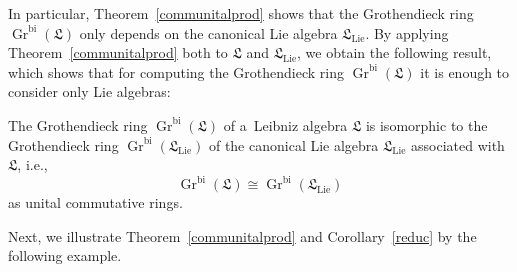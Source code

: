 \documentclass{jonasart}
\DeclareMathOperator{\bi}{bi}
\DeclareMathOperator{\K}{Gr}
\DeclareMathOperator{\lie}{Lie}
\newcommand{\lf}{\mathfrak{L}}
\begin{document}
	In particular, Theorem~\ref{communitalprod} shows that the Grothendieck ring
	$\K^{\bi}(\lf)$ only depends on the canonical Lie algebra $\lf_{\lie}$. By applying
	Theorem~\ref{communitalprod} both to $\lf$ and $\lf_{\lie}$, we obtain the following result, which shows that for computing the Grothendieck ring $\K^{\bi}
	(\lf)$ it is enough to consider only Lie algebras:
	\begin{corollary}\label{reduc}
		The Grothendieck ring $\K^{\bi}(\lf)$ of a~Leibniz algebra $\lf$ is isomorphic to the Grothendieck ring $\K^{\bi}(\lf_{\lie})$ of the canonical Lie algebra
		$\lf_{\lie}$ associated with $\lf$, i.e.,
		\[
			\K^{\bi}(\lf)\cong\K^{\bi}(\lf_{\lie})
		\]
		as unital commutative rings.
	\end{corollary}
	Next, we illustrate Theorem~\ref{communitalprod} and Corollary~\ref{reduc}
	by the following example.
\end{document}
